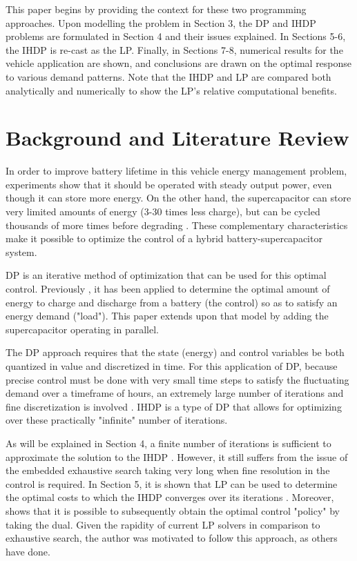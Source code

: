 \documentclass[conference]{IEEEtran}
\begin{document}
This paper begins by providing the context for these two programming approaches. Upon modelling the problem in Section 3, the DP and IHDP problems are formulated in Section 4 and their issues explained. In Sections 5-6, the IHDP is re-cast as the LP. Finally, in Sections 7-8, numerical results for the vehicle application are shown, and conclusions are drawn on the optimal response to various demand patterns. Note that the IHDP and LP are compared both analytically and numerically to show the LP's relative computational benefits.


\section{Background and Literature Review}
In order to improve battery lifetime in this vehicle energy management problem, experiments \cite{thounthong2009energy} show that it should be operated with steady output power, even though it can store more energy. On the other hand, the supercapacitor can store very limited amounts of energy (3-30 times less charge), but can be cycled thousands of more times before degrading \cite{thounthong2009energy}. These complementary characteristics make it possible to optimize the control of a hybrid battery-supercapacitor system.

DP is an iterative method of optimization that can be used for this optimal control. Previously \cite{thounthong2009energy}, it has been applied to determine the optimal amount of energy to charge and discharge from a battery (the control) so as to satisfy an energy demand ("load"). This paper extends upon that model by adding the supercapacitor operating in parallel.

The DP approach requires that the state (energy) and control variables be both quantized in value and discretized in time. For this application of DP, because precise control must be done with very small time steps to satisfy the fluctuating demand over a timeframe of hours, an extremely large number of iterations and fine discretization is involved \cite{6183284}. IHDP is a type of DP that allows for optimizing over these practically "infinite" number of iterations.

As will be explained in Section 4, a finite number of iterations is sufficient to approximate the solution to the IHDP \cite{Bertsekas:2007:DPO:1396348}. However, it still suffers from the issue of the embedded exhaustive search taking very long when fine resolution in the control is required. In Section 5, it is shown that LP can be used to determine the optimal costs to which the IHDP converges over its iterations \cite{Bertsekas:2007:DPO:1396348}. Moreover, \cite{4220813} shows that it is possible to subsequently obtain the optimal control "policy" by taking the dual. Given the rapidity of current LP solvers in comparison to exhaustive search, the author was motivated to follow this approach, as others have done.
\end{document}
